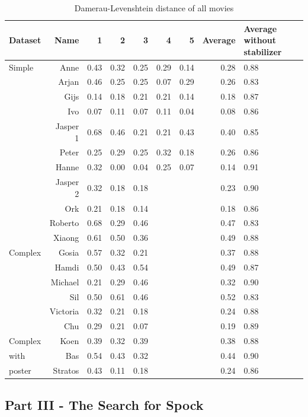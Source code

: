 \begin{table}
\centering
\begin{tabular}{p{0.4in}rrrrrrrp{0.55in}}
\hline
Dataset & Name	& 1 & 2 & 3 & 4 & 5 & Average & Average without stabilizer\\
\hline
Simple & Anne	&	0.43	&	0.32	&	0.25	&	0.29	&	0.14	&	0.28	&	0.88 \\
 & Arjan	&	0.46	&	0.25	&	0.25	&	0.07	&	0.29	&	0.26	&	0.83 \\
 & Gijs	&	0.14	&	0.18	&	0.21	&	0.21	&	0.14	&	0.18	&	0.87 \\
 & Ivo	&	0.07	&	0.11	&	0.07	&	0.11	&	0.04	&	0.08	&	0.86 \\
 & Jasper 1	&	0.68	&	0.46	&	0.21	&	0.21	&	0.43	&	0.40	&	0.85 \\
 & Peter	&	0.25	&	0.29	&	0.25	&	0.32	&	0.18	&	0.26	&	0.86 \\
 & Hanne	&	0.32	&	0.00	&	0.04	&	0.25	&	0.07	&	0.14	&	0.91 \\
 & Jasper 2	&	0.32	&	0.18	&	0.18	&	 	&	 	&	0.23	&	0.90 \\
 & Ork	&	0.21	&	0.18	&	0.14	&	 	&	 	&	0.18	&	0.86 \\
 & Roberto	&	0.68	&	0.29	&	0.46	&	 	&	 	&	0.47	&	0.83 \\
 & Xiaong	&	0.61	&	0.50	&	0.36	&	 	&	 	&	0.49	&	0.88 \\
\hline
Complex & Gosia	&	0.57	&	0.32	&	0.21	&	 	&	 	&	0.37	&	0.88 \\
 & Hamdi	&	0.50	&	0.43	&	0.54	&	 	&	 	&	0.49	&	0.87 \\
 & Michael	&	0.21	&	0.29	&	0.46	&	 	&	 	&	0.32	&	0.90 \\
 & Sil	&	0.50	&	0.61	&	0.46	&	 	&	 	&	0.52	&	0.83 \\
 & Victoria	&	0.32	&	0.21	&	0.18	&	 	&	 	&	0.24	&	0.88 \\
 & Chu	&	0.29	&	0.21	&	0.07	&	 	&	 	&	0.19	&	0.89 \\
\hline
Complex & Koen	&	0.39	&	0.32	&	0.39	&	 	&	 	&	0.38	&	0.88\\
with & Bas	&	0.54	&	0.43	&	0.32	&	 	&	 	&	0.44	&	0.90 \\
poster & Stratos	&	0.43	&	0.11	&	0.18	&	 	&	 	&	0.24	&	0.86 \\


\hline
\end{tabular}
\caption{Damerau-Levenshtein distance of all movies}
\label{tab:distance}
\end{table}



\subsection{Part III - The Search for Spock}

